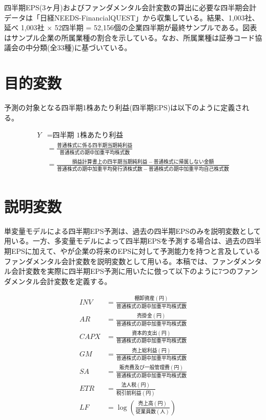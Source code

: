 \documentclass[a4paper, 12pt]{jsreport}
\begin{document}
四半期EPS(3ヶ月)およびファンダメンタル会計変数の算出に必要な四半期会計データは「日経NEEDS-FinancialQUEST」から収集している。結果、1,003社、延べ 1,003社 × 52四半期 = 52,156個の企業四半期が最終サンプルである。図表はサンプル企業の所属業種の割合を示している。なお、所属業種は証券コード協議会の中分類(全33種)に基づいている。



\section{目的変数}

予測の対象となる四半期1株あたり利益(四半期EPS)は以下のように定義される。

\begin{equation}
  \begin{split}
    Y &= \text{四半期 1株あたり利益} \\
    &= \frac{普通株式に係る四半期当期純利益}{普通株式の期中加重平均株式数} \\
    &= \frac{損益計算書上の四半期当期純利益-普通株式に帰属しない金額}{普通株式の期中加重平均発行済株式数 - 普通株式の期中加重平均自己株式数} \\  
  \end{split}
\end{equation}

\section{説明変数}

単変量モデルによる四半期EPS予測は、過去の四半期EPSのみを説明変数として用いる。一方、多変量モデルによって四半期EPSを予測する場合は、過去の四半期EPSに加えて、\cite{lev1993fundamental}や\cite{abarbanell1997fundamental}が企業の将来のEPSに対して予測能力を持つと言及しているファンダメンタル会計変数を説明変数として用いる。本稿では、ファンダメンタル会計変数を実際に四半期EPS予測に用いた\cite{zhang2004neural}に倣って以下のように7つのファンダメンタル会計変数を定義する。

\begin{equation}
  \begin{split}
    INV &= \frac{棚卸資産(円)}{普通株式の期中加重平均株式数} \\
    AR &= \frac{売掛金(円)}{普通株式の期中加重平均株式数} \\
    CAPX &= \frac{資本的支出(円)}{普通株式の期中加重平均株式数} \\
    GM &= \frac{売上総利益(円)}{普通株式の期中加重平均株式数} \\
    SA &= \frac{販売費及び一般管理費(円)}{普通株式の期中加重平均株式数} \\
    ETR &= \frac{法人税(円)}{税引前利益(円)} \\
    LF &= \log{\left(\frac{売上高(円)}{従業員数(人)}\right)} \\
  \end{split}
\end{equation}
\end{document}
